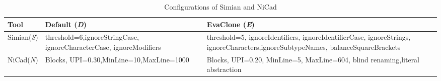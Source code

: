 \documentclass[sigconf,review, anonymous]{acmart}
\begin{document}
\begin{table}
	\centering
	\caption{Configurations of Simian and NiCad}
	\label{t:param_tuning}
	\small
	\begin{tabular}{p{0.7cm}|p{2.4cm}|p{3.5cm}}
		\hline 
		Tool & Default (\textit{D}) & EvaClone (\textit{E}) \\
		\hline
		Simian\newline (\textit{S}) &  threshold=6,\newline ignoreStringCase, \newline ignoreCharacterCase, \newline ignoreModifiers & threshold=5, ignoreIdentifiers, \newline ignoreIdentifierCase, \newline ignoreStrings, \newline ignoreCharacters,\newline ignoreSubtypeNames, \newline balanceSquareBrackets \\ 
		\hline 
		NiCad\newline (\textit{N}) & Blocks, UPI=0.30,\newline MinLine=10,\newline MaxLine=1000 & Blocks, UPI=0.20, \newline MinLine=5, MaxLine=604, \newline blind renaming,\newline literal abstraction \\
		\hline
	\end{tabular} %
\end{table}

\end{document}
